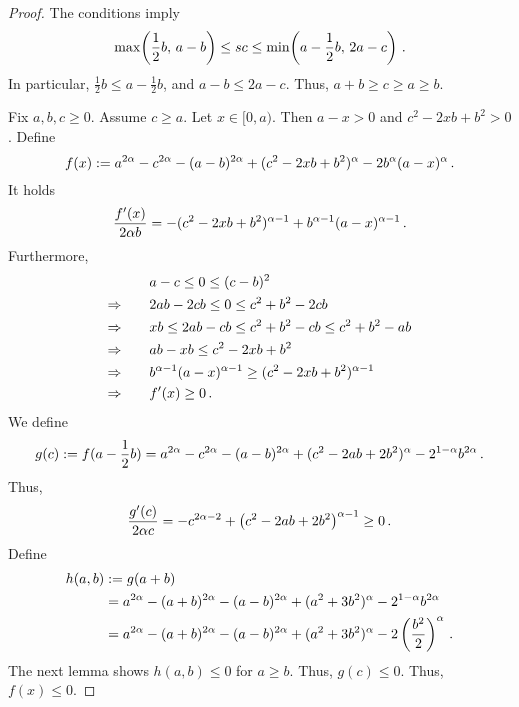 \begin{proof}
	The conditions imply
	\begin{equation*}
		\max\!\left( \frac 12 b,\, a-b \right) \leq sc \leq \min\!\left( a-\frac12b,\, 2a-c \right)
		\, .
	\end{equation*}
	In particular, $\frac 12 b \leq a-\frac12b$, and $a-b \leq 2a-c$. Thus, $a+b \geq c \geq a \geq b$.
	
	Fix $a,b,c \geq 0$.
	Assume $c \geq a$. Let $x \in[0,a)$. Then $a-x>0$ and $c^2 - 2 x b + b^2 >0$.
	Define 
	\begin{equation*}
		f(x) := a^{2\alpha}-c^{2\alpha}-(a-b)^{2\alpha}+(c^2 - 2 x b + b^2)^\alpha  - 2 b^\alpha (a-x)^{\alpha}
		\, .
	\end{equation*}
	It holds
	\begin{equation*}
		\frac{f^\prime(x) }{2 \alpha b} = -(c^2 - 2 x b + b^2)^{\alpha-1}  + b^{\alpha-1} (a-x)^{\alpha-1}
		\, .
	\end{equation*}
	Furthermore,
	\begin{align*}
		&a-c\leq 0 \leq (c-b)^2
		\\\Rightarrow\qquad&
		2ab-2cb \leq 0 \leq c^2+b^2-2cb
		\\\Rightarrow\qquad&
		xb \leq 2ab-cb \leq c^2+b^2-cb \leq c^2+b^2 -ab
		\\\Rightarrow\qquad&
		ab -xb \leq c^2-2xb + b^2
		\\\Rightarrow\qquad&
		b^{\alpha-1} (a-x)^{\alpha-1} \geq (c^2 - 2 x b + b^2)^{\alpha-1}
		\\\Rightarrow\qquad&
		f^\prime(x) \geq 0\, .
	\end{align*}
	We define
	\begin{equation*}
		g(c) := f(a-\frac12b) = a^{2\alpha}-c^{2\alpha}-(a-b)^{2\alpha}+(c^2 - 2 a b + 2 b^2)^\alpha  - 2^{1-\alpha} b^{2\alpha}
		\, .
	\end{equation*}
	Thus,
	\begin{equation*}
		\frac{g^\prime(c)}{2\alpha c} = -c^{2\alpha-2}+\left( c^2 - 2 a b + 2 b^2 \right)^{\alpha-1} \geq 0
		\, .
	\end{equation*}
	Define
	\begin{align*}
		h (a,b) &:= 
		g(a+b) 
		\\&= 
		a^{2\alpha}-(a+b)^{2\alpha}-(a-b)^{2\alpha}+(a^2  + 3 b^2)^\alpha  - 2^{1-\alpha} b^{2\alpha}
		\\&=
		a^{2\alpha}-(a+b)^{2\alpha}-(a-b)^{2\alpha}+(a^2  + 3 b^2)^\alpha  - 2\left( \frac{b^2}{2} \right)^{\alpha}
		\, .
	\end{align*}
	The next lemma shows $h(a,b) \leq 0$ for $a\geq b$. Thus, $g(c) \leq 0$. Thus, $f(x) \leq 0$.
\end{proof}
